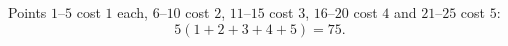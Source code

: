 Points $1$--$5$ cost $1$ each, $6$--$10$ cost $2$, $11$--$15$ cost $3$, $16$--$20$ cost $4$ and $21$--$25$ cost $5$:
\[5(1+2+3+4+5)=\boxed{75}.\]
